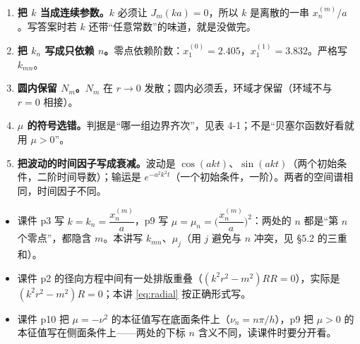 \documentclass[11pt]{ctexart}
\let\origsubhdr\subhdr
\renewcommand{\subhdr}[1]{\par\needspace{3\baselineskip}\origsubhdr{#1}}
\let\orighdr\hdr
\renewcommand{\hdr}[2]{\par\needspace{6\baselineskip}\orighdr{#1}{#2}}
\begin{document}

\begin{enumerate}[label=(\arabic*)]
  \item \textbf{把 $k$ 当成连续参数。}$k$ 必须让 $J_m(ka)=0$，所以 $k$ 是离散的一串 $x_n^{(m)}/a$。写答案时若 $k$ 还带“任意常数”的味道，就是没做完。
  \item \textbf{把 $k_n$ 写成只依赖 $n$。}零点依赖阶数：$x_1^{(0)}=2.405$，$x_1^{(1)}=3.832$。严格写 $k_{mn}$。
  \item \textbf{圆内保留 $N_m$。}$N_m$ 在 $r\to0$ 发散；圆内必须丢，环域才保留（环域不与 $r=0$ 相接）。
  \item \textbf{$\mu$ 的符号选错。}判据是“哪一组边界齐次”，见表 4-1；不是“贝塞尔函数好看就用 $\mu>0$”。
  \item \textbf{把波动的时间因子写成衰减。}波动是 $\cos(a kt)$、$\sin(a kt)$（两个初始条件，二阶时间导数）；输运是 $e^{-a^2k^2t}$（一个初始条件，一阶）。两者的空间谱相同，时间因子不同。
\end{enumerate}


\begin{itemize}
  \item 课件 p3 写 $k=k_n=\dfrac{x_n^{(m)}}{a}$，p9 写 $\mu=\mu_n=\Big(\dfrac{x_n^{(m)}}{a}\Big)^2$：两处的 $n$ 都是“第 $n$ 个零点”，都隐含 $m$。本讲写 $k_{mn}$、$\mu_j$（用 $j$ 避免与 $n$ 冲突，见 \S5.2 的三重和）。
  \item 课件 p2 的径向方程中间有一处排版重叠（$(k^2r^2-m^2)RR=0$），实际是 $(k^2r^2-m^2)R=0$；本讲 \eqref{eq:radial} 按正确形式写。
  \item 课件 p10 把 $\mu=-\nu^2$ 的本征值写在底面条件上（$\nu_n=n\pi/h$），p9 把 $\mu>0$ 的本征值写在侧面条件上——两处的下标 $n$ 含义不同，读课件时要分开看。
\end{itemize}

\label{sec:s7}
\end{document}
